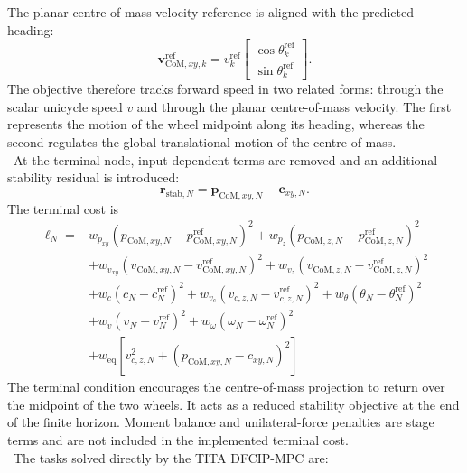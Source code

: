%
The planar centre-of-mass velocity reference is aligned with the predicted
heading:
%
\begin{equation}
    \mathbf{v}_{\mathrm{CoM},xy,k}^{\mathrm{ref}}
    =
    v_k^{\mathrm{ref}}
    \begin{bmatrix}
        \cos\theta_k^{\mathrm{ref}} \\
        \sin\theta_k^{\mathrm{ref}}
    \end{bmatrix}.
    \label{eq:dfcip_com_velocity_reference}
\end{equation}
%
The objective therefore tracks forward speed in two related forms: through the
scalar unicycle speed $v$ and through the planar centre-of-mass velocity. The
first represents the motion of the wheel midpoint along its heading, whereas
the second regulates the global translational motion of the centre of mass.\\
\
At the terminal node, input-dependent terms are removed and an additional
stability residual is introduced:
%
\begin{equation}
    \mathbf{r}_{\mathrm{stab},N}
    =
    \mathbf{p}_{\mathrm{CoM},xy,N}
    -
    \mathbf{c}_{xy,N}.
    \label{eq:dfcip_terminal_stability}
\end{equation}
%
The terminal cost is
%
\begin{equation}
\begin{aligned}
    \ell_N =
        &w_{p_{xy}}
        \left(
            p_{\mathrm{CoM},xy,N}
            -p_{\mathrm{CoM},xy,N}^{\mathrm{ref}}
        \right)^2
        +w_{p_z}
        \left(
            p_{\mathrm{CoM},z,N}
            -p_{\mathrm{CoM},z,N}^{\mathrm{ref}}
        \right)^2
        \\
        &+w_{v_{xy}}
        \left(
            v_{\mathrm{CoM},xy,N}
            -v_{\mathrm{CoM},xy,N}^{\mathrm{ref}}
        \right)^2
        +w_{v_z}
        \left(
            v_{\mathrm{CoM},z,N}
            -v_{\mathrm{CoM},z,N}^{\mathrm{ref}}
        \right)^2
        \\
        &+w_c
        \left(
            c_N-c_N^{\mathrm{ref}}
        \right)^2
        +w_{v_c}
        \left(
            v_{c,z,N}-v_{c,z,N}^{\mathrm{ref}}
        \right)^2
        +w_{\theta}
        \left(
            \theta_N-\theta_N^{\mathrm{ref}}
        \right)^2
        \\
        &+w_v
        \left(
            v_N-v_N^{\mathrm{ref}}
        \right)^2
        +w_{\omega}
        \left(
            \omega_N-\omega_N^{\mathrm{ref}}
        \right)^2
        \\
        &+w_{\mathrm{eq}}
        \left[
            v_{c,z,N}^{2}
            +\left(
                p_{\mathrm{CoM},xy,N}-c_{xy,N}
            \right)^2
        \right]
\end{aligned}
\label{eq:dfcip_terminal_cost}
\end{equation}
%
The terminal condition encourages the centre-of-mass projection to return over
the midpoint of the two wheels. It acts as a reduced stability objective at the
end of the finite horizon. Moment balance and unilateral-force penalties are
stage terms and are not included in the implemented terminal cost.\\
\
The tasks solved directly by the TITA DFCIP-MPC are:

